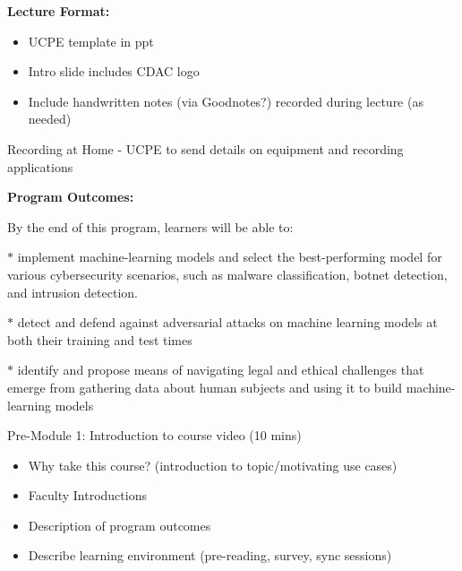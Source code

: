 \documentclass[12pt]{article}
\renewcommand{\_}{\kern-1.5pt\textunderscore\kern-1.5pt}
\begin{document}
\vspace{\baselineskip}
\textbf{Lecture Format: }\par

\begin{itemize}
	\item UCPE template in ppt \par

	\item Intro slide includes CDAC logo \par

	\item Include handwritten notes (via Goodnotes?) recorded during lecture (as needed)
\end{itemize}\par


\vspace{\baselineskip}
Recording at Home - UCPE to send details on equipment and recording applications \par


\vspace{\baselineskip}
\textbf{Program Outcomes:} \par


\vspace{\baselineskip}
\setlength{\parskip}{12.0pt}
By the end of this program, learners will be able to:\par

$\ast$  implement machine-learning models and select the best-performing model for various cybersecurity scenarios, such as malware classification, botnet detection, and intrusion detection.\par

$\ast$  detect and defend against adversarial attacks on machine learning models at both their training and test times\par

$\ast$  identify and propose means of navigating legal and ethical challenges that emerge from gathering data about human subjects and using it to build machine-learning models\par


\vspace{\baselineskip}

\vspace{\baselineskip}
Pre-Module 1: Introduction to course video (10 mins)\par

\begin{itemize}
	\item Why take this course? (introduction to topic/motivating use cases)\par

	\item Faculty Introductions \par

	\item Description of program outcomes \par

	\item Describe learning environment (pre-reading, survey, sync sessions) 
\end{itemize}\par
\end{document}

